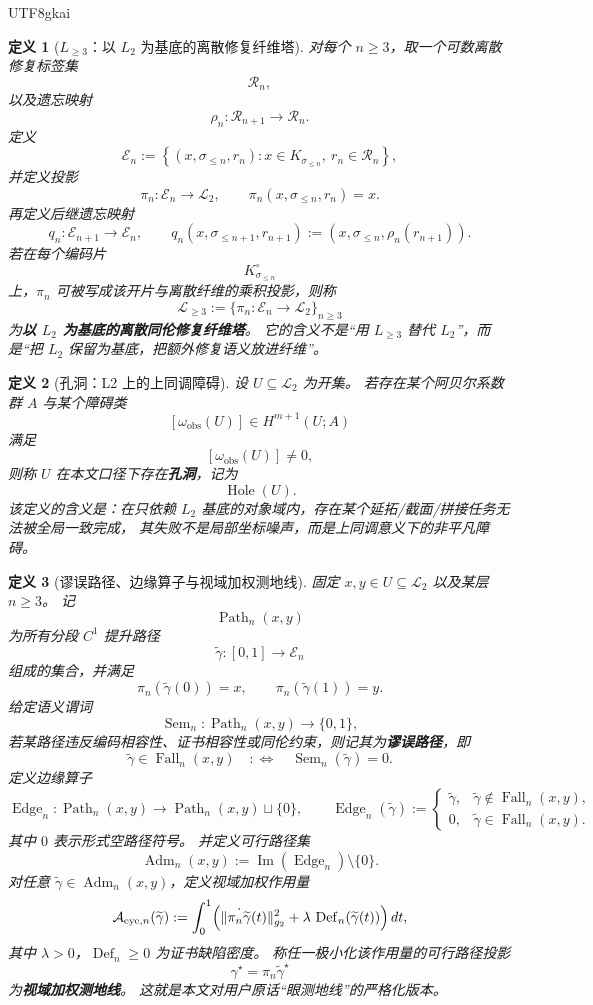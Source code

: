 \documentclass[12pt]{article}
\newtheorem{definition}{定义}[section]
\newcommand{\Ltwo}{\mathcal{L}_2}
\newcommand{\Lge}{\mathcal{L}_{\ge 3}}
\newcommand{\Hole}{\operatorname{Hole}}
\newcommand{\Fall}{\operatorname{Fall}}
\newcommand{\Edge}{\operatorname{Edge}}
\newcommand{\Adm}{\operatorname{Adm}}
\newcommand{\Path}{\operatorname{Path}}
\newcommand{\Sem}{\operatorname{Sem}}
\newcommand{\Defect}{\operatorname{Def}}
\newcommand{\Img}{\operatorname{Im}}
\begin{document}
\begin{CJK*}{UTF8}{gkai}
\begin{definition}[$L_{\ge 3}$：以 $L_2$ 为基底的离散修复纤维塔]
\label{def:tex41-lge-bundle}
对每个 $n\ge 3$，取一个可数离散修复标签集
\[
  \mathcal{R}_n,
\]
以及遗忘映射
\[
  \rho_n:\mathcal{R}_{n+1}\to\mathcal{R}_n.
\]
定义
\[
  \mathcal E_n
  :=
  \left\{
    (x,\sigma_{\le n},r_n):
    x\in K_{\sigma_{\le n}},\
    r_n\in\mathcal R_n
  \right\},
\]
并定义投影
\[
  \pi_n:\mathcal E_n\to\Ltwo,\qquad
  \pi_n(x,\sigma_{\le n},r_n)=x.
\]
再定义后继遗忘映射
\[
  q_n:\mathcal E_{n+1}\to\mathcal E_n,\qquad
  q_n(x,\sigma_{\le n+1},r_{n+1})
  :=
  (x,\sigma_{\le n},\rho_n(r_{n+1})).
\]
若在每个编码片
\[
  K_{\sigma_{\le n}}^\circ
\]
上，$\pi_n$ 可被写成该开片与离散纤维的乘积投影，则称
\[
  \Lge:=\{\pi_n:\mathcal E_n\to\Ltwo\}_{n\ge 3}
\]
为\textbf{以 $L_2$ 为基底的离散同伦修复纤维塔}。
它的含义不是“用 $L_{\ge 3}$ 替代 $L_2$”，而是“把 $L_2$ 保留为基底，把额外修复语义放进纤维”。
\end{definition}

\begin{definition}[孔洞：L2 上的上同调障碍]
\label{def:tex41-hole}
设 $U\subseteq\Ltwo$ 为开集。
若存在某个阿贝尔系数群 $A$ 与某个障碍类
\[
  [\omega_{\mathrm{obs}}(U)]\in H^{m+1}(U;A)
\]
满足
\[
  [\omega_{\mathrm{obs}}(U)]\neq 0,
\]
则称 $U$ 在本文口径下存在\textbf{孔洞}，记为
\[
  \Hole(U).
\]
该定义的含义是：在只依赖 $L_2$ 基底的对象域内，存在某个延拓/截面/拼接任务无法被全局一致完成，
其失败不是局部坐标噪声，而是上同调意义下的非平凡障碍。
\end{definition}

\begin{definition}[谬误路径、边缘算子与视域加权测地线]
\label{def:tex41-eye-geodesic}
固定 $x,y\in U\subseteq \Ltwo$ 以及某层 $n\ge 3$。
记
\[
  \Path_n(x,y)
\]
为所有分段 $C^1$ 提升路径
\[
  \widetilde\gamma:[0,1]\to\mathcal E_n
\]
组成的集合，并满足
\[
  \pi_n(\widetilde\gamma(0))=x,\qquad
  \pi_n(\widetilde\gamma(1))=y.
\]
给定语义谓词
\[
  \Sem_n:\Path_n(x,y)\to\{0,1\},
\]
若某路径违反编码相容性、证书相容性或同伦约束，则记其为\textbf{谬误路径}，即
\[
  \widetilde\gamma\in\Fall_n(x,y)
  \quad:\Longleftrightarrow\quad
  \Sem_n(\widetilde\gamma)=0.
\]
定义边缘算子
\[
  \Edge_n:\Path_n(x,y)\to\Path_n(x,y)\sqcup\{0\},\qquad
  \Edge_n(\widetilde\gamma)
  :=
  \left\{
  \begin{array}{ll}
    \widetilde\gamma,& \widetilde\gamma\notin\Fall_n(x,y),\\[0.4em]
    0,& \widetilde\gamma\in\Fall_n(x,y).
  \end{array}
  \right.
\]
其中 $0$ 表示形式空路径符号。
并定义可行路径集
\[
  \Adm_n(x,y):=\Img(\Edge_n)\setminus\{0\}.
\]
对任意 $\widetilde\gamma\in\Adm_n(x,y)$，定义视域加权作用量
\[
  \mathcal A_{\mathrm{eye},n}(\widetilde\gamma)
  :=
  \int_0^1
  \Bigl(
    \|\dot{\pi_n\widetilde\gamma}(t)\|_{g_2}^2
    +
    \lambda\,\Defect_n(\widetilde\gamma(t))
  \Bigr)\,dt,
\]
其中 $\lambda>0$，$\Defect_n\ge 0$ 为证书缺陷密度。
称任一极小化该作用量的可行路径投影
\[
  \gamma^\star=\pi_n\widetilde\gamma^\star
\]
为\textbf{视域加权测地线}。
这就是本文对用户原话“眼测地线”的严格化版本。
\end{definition}


\end{CJK*}
\end{document}
